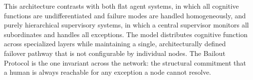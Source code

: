 This architecture contrasts with both flat agent systems, in which all cognitive functions are undifferentiated and failure modes are handled homogeneously, and purely hierarchical supervisory systems, in which a central supervisor monitors all subordinates and handles all exceptions. The \bxthree{} model distributes cognitive function across specialized layers while maintaining a single, architecturally defined failover pathway that is not configurable by individual nodes. The Bailout Protocol is the one invariant across the network: the structural commitment that a human is always reachable for any exception a node cannot resolve.
